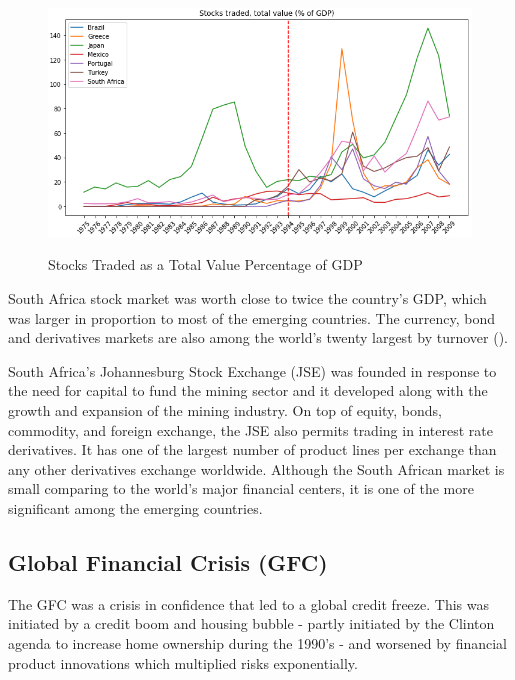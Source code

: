 \documentclass{elsarticle}
\begin{document}
\begin{figure}[!h]
    \centering
    \includegraphics[width=1\textwidth]{images/stock.jpg}
    \caption{Stocks Traded as a Total Value Percentage of GDP}
    \label{fig:Stocks Traded as a Total Value Percentage of GDP}
    \cite{stockstraded}
\end{figure}

South Africa stock market was worth close to twice the country's GDP, which was larger in proportion to most of the emerging countries. The currency, bond and derivatives markets are also among the world’s twenty largest by turnover (\cite{Hassan2013}). 

South Africa's Johannesburg Stock Exchange (JSE) was founded in response to the need for capital to fund the mining sector and it developed along with the growth and expansion of the mining industry. On top of equity, bonds, commodity, and foreign exchange, the JSE also permits trading in interest rate derivatives. It has one of the largest number of product lines per exchange than any other derivatives exchange worldwide. Although the South African market is small comparing to the world's major financial centers, it is one of the more significant among the emerging countries.

\subsection{Global Financial Crisis (GFC)}
The GFC was a crisis in confidence that led to a global credit freeze. This was initiated by a credit boom and housing bubble - partly initiated by the Clinton agenda to increase home ownership during the 1990’s - and worsened by financial product innovations which multiplied risks exponentially.
\end{document}
